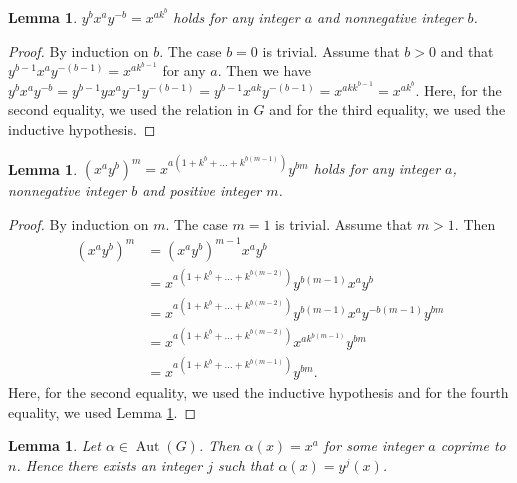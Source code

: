 \documentclass{amsart}
\newtheorem{lem}[thm]{Lemma}
\begin{document}
\begin{lem}\label{lemma31}
$y^b x^a y^{-b}=x^{ak^b}$ holds for any integer $a$ and nonnegative integer $b$.
\end{lem}

\begin{proof}
By induction on $b$.
The case $b=0$ is trivial.
Assume that $b>0$ and that $y^{b-1}x^a y^{-(b-1)}=x^{ak^{b-1}}$ for any $a$.
Then we have
$y^bx^a y^{-b}=y^{b-1}yx^{a}y^{-1}y^{-(b-1)}=
y^{b-1}x^{ak}y^{-(b-1)}
=x^{akk^{b-1}}
=x^{ak^b}$.
Here, for the second equality, we used the relation in $G$ and for the third equality, we used the inductive hypothesis. 
\end{proof}

\begin{lem}\label{lemma32}
$(x^ay^b)^m=x^{a(1+k^b+\dots + k^{b(m-1)})}y^{bm}$ 
holds for any integer $a$, nonnegative integer $b$ and positive integer $m$.
\end{lem}

\begin{proof}
By induction on $m$.
The case $m=1$ is trivial.
Assume that $m>1$.
Then
\begin{align*}
(x^ay^b)^m &= (x^ay^b)^{m-1} x^a y^b \\
&=x^{a(1+k^b+\dots + k^{b(m-2)})}y^{b(m-1)}x^ay^b \\
&= x^{a(1+k^b+\dots + k^{b(m-2)})}y^{b(m-1)}x^ay^{-b(m-1)}y^{bm} \\
&=x^{a(1+k^b+\dots + k^{b(m-2)})}x^{ak^{b(m-1)}}y^{bm} \\
&=x^{a(1+k^b+\dots + k^{b(m-1)})}y^{bm}.
\end{align*}
Here, for the second equality, we used the inductive hypothesis and for the fourth equality, we used Lemma \ref{lemma31}.
\end{proof}

\begin{lem}\label{x}
Let $\alpha \in \operatorname{Aut}(G)$.
Then $\alpha(x) = x^a$ for some integer $a$ coprime to $n$.
Hence there exists an integer $j$ such that $\alpha(x)=y^j(x)$.
\end{lem}
\end{document}
